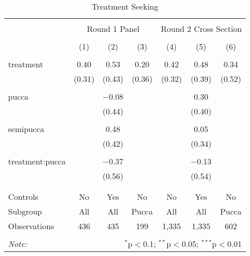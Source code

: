 
\begin{table}[!htbp] \centering 
  \caption{Treatment Seeking} 
  \label{tbl:Treatment Seeking} 
\begin{tabular}{@{\extracolsep{5pt}}lcccccc} 
\\[-1.8ex]\hline 
\hline \\[-1.8ex] 
 & \multicolumn{3}{c}{Round 1 Panel} & \multicolumn{3}{c}{Round 2 Cross Section} \\ 
\\[-1.8ex] & (1) & (2) & (3) & (4) & (5) & (6)\\ 
\hline \\[-1.8ex] 
 treatment & 0.40 & 0.53 & 0.20 & 0.42 & 0.48 & 0.34 \\ 
  & (0.31) & (0.43) & (0.36) & (0.32) & (0.39) & (0.52) \\ 
  & & & & & & \\ 
 pucca &  & $-$0.08 &  &  & 0.30 &  \\ 
  &  & (0.44) &  &  & (0.40) &  \\ 
  & & & & & & \\ 
 semipucca &  & 0.48 &  &  & 0.05 &  \\ 
  &  & (0.42) &  &  & (0.34) &  \\ 
  & & & & & & \\ 
 treatment:pucca &  & $-$0.37 &  &  & $-$0.13 &  \\ 
  &  & (0.56) &  &  & (0.54) &  \\ 
  & & & & & & \\ 
\hline \\[-1.8ex] 
Controls & No & Yes & No & No & Yes & No \\ 
Subgroup & All & All & Pucca & All & All & Pucca \\ 
Observations & 436 & 435 & 199 & 1,335 & 1,335 & 602 \\ 
\hline 
\hline \\[-1.8ex] 
\textit{Note:}  & \multicolumn{6}{r}{$^{*}$p$<$0.1; $^{**}$p$<$0.05; $^{***}$p$<$0.01} \\ 
\end{tabular} 
\end{table} 
